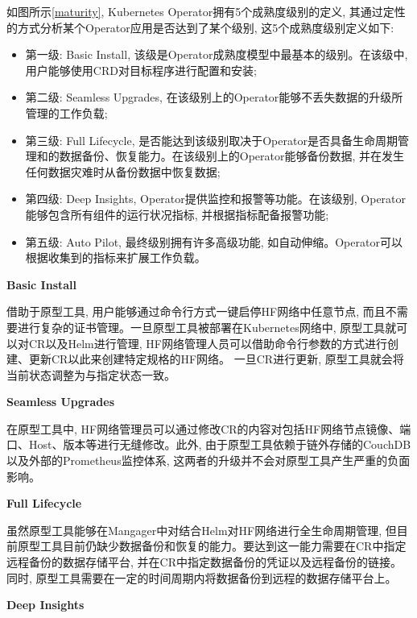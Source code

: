 如图所示\ref{maturity}, Kubernetes Operator拥有5个成熟度级别的定义\cite{duan2021case}, 其通过定性的方式分析某个Operator应用是否达到了某个级别, 这5个成熟度级别定义如下:

\begin{itemize}[itemindent=2em]
    \item 第一级: Basic Install, 该级是Operator成熟度模型中最基本的级别。在该级中, 用户能够使用CRD对目标程序进行配置和安装;

    \item 第二级: Seamless Upgrades, 在该级别上的Operator能够不丢失数据的升级所管理的工作负载;

    \item 第三级: Full Lifecycle, 是否能达到该级别取决于Operator是否具备生命周期管理和的数据备份、恢复能力。在该级别上的Operator能够备份数据, 并在发生任何数据灾难时从备份数据中恢复数据;

    \item 第四级: Deep Insights, Operator提供监控和报警等功能。在该级别, Operator能够包含所有组件的运行状况指标, 并根据指标配备报警功能;

    \item 第五级: Auto Pilot, 最终级别拥有许多高级功能, 如自动伸缩。Operator可以根据收集到的指标来扩展工作负载。

\end{itemize}

\textbf{Basic Install}

借助于原型工具, 用户能够通过命令行方式一键启停HF网络中任意节点, 而且不需要进行复杂的证书管理。一旦原型工具被部署在Kubernetes网络中, 原型工具就可以对CR以及Helm进行管理, HF网络管理人员可以借助命令行参数的方式进行创建、更新CR以此来创建特定规格的HF网络。 一旦CR进行更新, 原型工具就会将当前状态调整为与指定状态一致。

\textbf{Seamless Upgrades}

在原型工具中, HF网络管理员可以通过修改CR的内容对包括HF网络节点镜像、端口、Host、版本等进行无缝修改。此外, 由于原型工具依赖于链外存储的CouchDB以及外部的Prometheus监控体系, 这两者的升级并不会对原型工具产生严重的负面影响。 

\textbf{Full Lifecycle}

虽然原型工具能够在Mangager中对结合Helm对HF网络进行全生命周期管理, 但目前原型工具目前仍缺少数据备份和恢复的能力。要达到这一能力需要在CR中指定远程备份的数据存储平台, 并在CR中指定数据备份的凭证以及远程备份的链接。同时, 原型工具需要在一定的时间周期内将数据备份到远程的数据存储平台上。

\textbf{Deep Insights}

